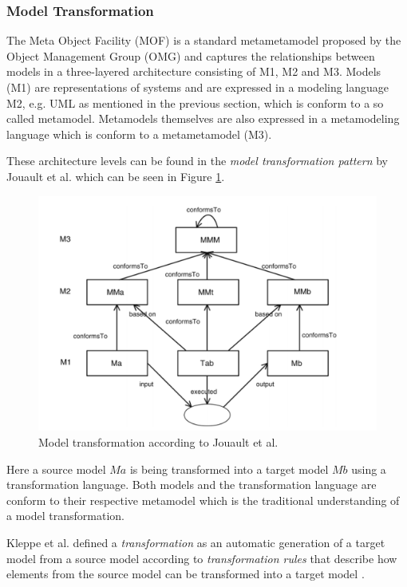 \subsubsection{Model Transformation}
\label{subsubsec:modeltrans}
The Meta Object Facility (MOF) \cite{omg2013mof} is a standard metametamodel proposed by the Object Management Group (OMG) and captures the relationships between models in a three-layered architecture consisting of M1, M2 and M3. Models (M1) are representations of systems and are expressed in a modeling language M2, e.g. UML as mentioned in the previous section, which is conform to a so called metamodel. Metamodels themselves are also expressed in a metamodeling language which is conform to a metametamodel (M3). 

These architecture levels can be found in the \textit{model transformation pattern} by Jouault et al. \cite{modeltrans} which can be seen in Figure \ref{fig:metametamodel}. 

\begin{figure}[H]
\centering
\includegraphics[width=\textwidth]{pictures/metametamodel.png}
\caption{Model transformation according to Jouault et al.}
\label{fig:metametamodel}
\end{figure}

Here a source model $Ma$ is being transformed into a target model $Mb$ using a transformation language. Both models and the transformation language are conform to their respective metamodel which is the traditional understanding of a model transformation.

Kleppe et al. defined a \textit{transformation} as an automatic generation of a target model from a source model according to \textit{transformation rules} that describe how elements from the source model can be transformed into a target model \cite{Kleppe:2003:MEM:829557}. 

